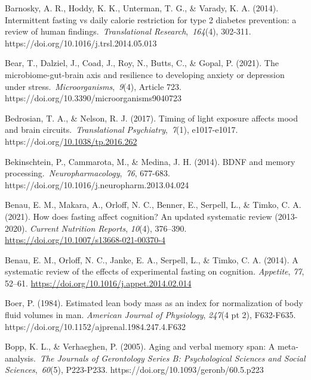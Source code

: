 \documentclass[authordate, empirical]{jote-new-article}
\begin{document}
Barnosky, A. R., Hoddy, K. K., Unterman, T. G., \& Varady, K. A. (2014). Intermittent fasting vs daily calorie restriction for type 2 diabetes prevention: a review of human findings. \emph{Translational Research}, \emph{164}(4), 302-311. https://doi.org/10.1016/j.trsl.2014.05.013



Bear, T., Dalziel, J., Coad, J., Roy, N., Butts, C., \& Gopal, P. (2021). The microbiome-gut-brain axis and resilience to developing anxiety or depression under stress. \emph{Microorganisms}, \emph{9}(4), Article 723. https://doi.org/10.3390/microorganisms9040723



Bedrosian, T. A., \& Nelson, R. J. (2017). Timing of light exposure affects mood and brain circuits. \emph{Translational Psychiatry}, \emph{7}(1), e1017-e1017. https://doi.org/\href{https://doi.org/10.1038/tp.2016.262}{10.1038/tp.2016.262}



Bekinschtein, P., Cammarota, M., \& Medina, J. H. (2014). BDNF and memory processing. \emph{Neuropharmacology}, \emph{76}, 677-683. https://doi.org/10.1016/j.neuropharm.2013.04.024



Benau, E. M., Makara, A., Orloff, N. C., Benner, E., Serpell, L., \& Timko, C. A. (2021). How does fasting affect cognition? An updated systematic review (2013-2020). \emph{Current Nutrition Reports}, \emph{10}(4), 376--390. \href{https://doi.org/10.1007/s13668-021-00370-4}{https://doi.org/10.1007/s13668-021-00370-4}



Benau, E. M., Orloff, N. C., Janke, E. A., Serpell, L., \& Timko, C. A. (2014). A systematic review of the effects of experimental fasting on cognition. \emph{Appetite}, \emph{77}, 52--61. \href{https://doi.org/10.1016/j.appet.2014.02.014}{https://doi.org/10.1016/j.appet.2014.02.014}



Boer, P. (1984). Estimated lean body mass as an index for normalization of body fluid volumes in man. \emph{American Journal of Physiology}, \emph{247}(4 pt 2), F632-F635. https://doi.org/10.1152/ajprenal.1984.247.4.F632



Bopp, K. L., \& Verhaeghen, P. (2005). Aging and verbal memory span: A meta-analysis. \emph{The Journals of Gerontology Series B: Psychological Sciences and Social Sciences}, \emph{60}(5), P223-P233. https://doi.org/10.1093/geronb/60.5.p223
\end{document}
